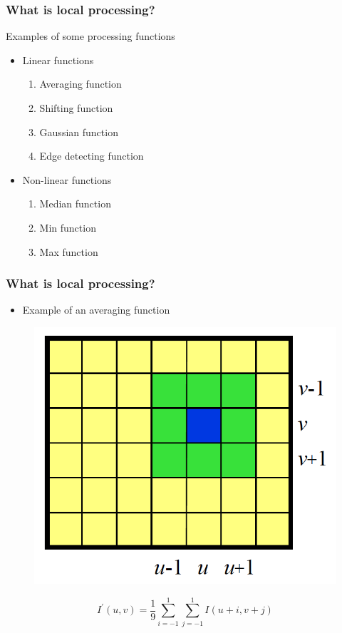 \documentclass[english,11pt,table,handout]{beamer}
\begin{document}
\frame
{
	\frametitle{What is local processing?}
	\begin{example}{Examples of some processing functions}
	\begin{itemize}
		\item Linear functions
		\begin{enumerate}
			\item Averaging function
			\item Shifting function
			\item Gaussian function
			\item Edge detecting function
		\end{enumerate}
		\item Non-linear functions
		\begin{enumerate}
			\item Median function
			\item Min function
			\item Max function
		\end{enumerate}
	\end{itemize}
	\end{example}
}
\frame
{
	\frametitle{What is local processing?}
	\begin{itemize}
		\item Example of an averaging function
	\end{itemize}
	\centering
	\begin{figure}[!h]
		\includegraphics[scale=0.5]{neighborhood.png}
	\end{figure}
	\begin{equation*}
		I^{'}{(u,v)} = \frac{1}{9}\sum_{i=-1}^{1}{\sum_{j=-1}^{1}{I(u+i, v+j)}}
	\end{equation*}
	
}
\end{document}
